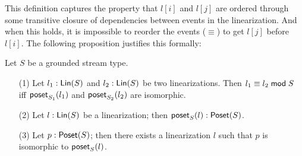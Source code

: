 This definition captures the property that $l[i]$ and $l[j]$ are ordered through some transitive closure of dependencies between events in the linearization. And when this holds, it is impossible to reorder the events ($\equiv$) to get $l[j]$ before $l[i]$.
The following proposition justifies this formally:
\begin{proposition}
\label{prop:lin-poset-correspondence}
Let $S$ be a grounded stream type.
\begin{enumerate}
\item[(1)] Let $\lintype{l_1}{S}$ and $\lintype{l_2}{S}$ be two linearizations.
Then $\equivtype{l_1}{l_2}{S}$ iff $\posetlin{l_1}{S_1}$ and $\posetlin{l_2}{S_2}$ are isomorphic.
\item[(2)] Let $\lintype{l}{S}$ be a linearization; then $\posettype{\posetlin{l}{S}}{S}$.
\item[(3)] Let $\posettype{p}{S}$; then there exists a linearization $l$ such that $p$ is isomorphic to $\posetlin{l}{S}$.
\end{enumerate}
\end{proposition}

